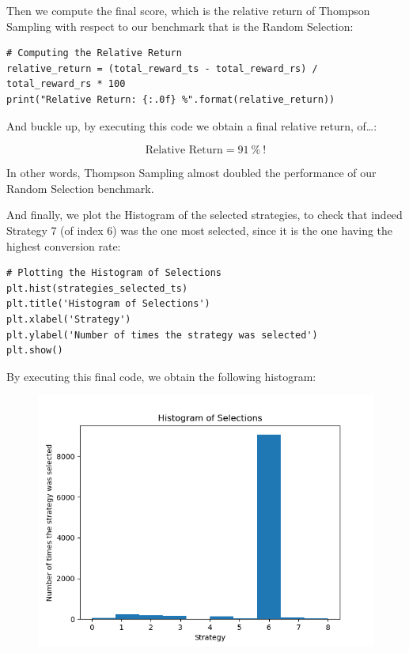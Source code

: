 \documentclass[]{book}
\begin{document}
Then we compute the final score, which is the relative return of Thompson Sampling with respect to our benchmark that is the Random Selection:

\begin{lstlisting}
# Computing the Relative Return
relative_return = (total_reward_ts - total_reward_rs) / total_reward_rs * 100
print("Relative Return: {:.0f} %".format(relative_return))
\end{lstlisting}

And buckle up, by executing this code we obtain a final relative return, of\ldots{}:

\begin{equation*}
    \textrm{Relative Return} = 91 \ \% \ !
\end{equation*}

In other words, Thompson Sampling almost doubled the performance of our Random Selection benchmark.

\newpage

And finally, we plot the Histogram of the selected strategies, to check that indeed Strategy 7 (of index 6) was the one most selected, since it is the one having the highest conversion rate:

\begin{lstlisting}
# Plotting the Histogram of Selections
plt.hist(strategies_selected_ts)
plt.title('Histogram of Selections')
plt.xlabel('Strategy')
plt.ylabel('Number of times the strategy was selected')
plt.show()
\end{lstlisting}

By executing this final code, we obtain the following histogram:

\begin{figure}[!htbp]
        \begin{center}
            \includegraphics[scale=0.8]{Histogram.png}
        \end{center}
\end{figure}
\end{document}
